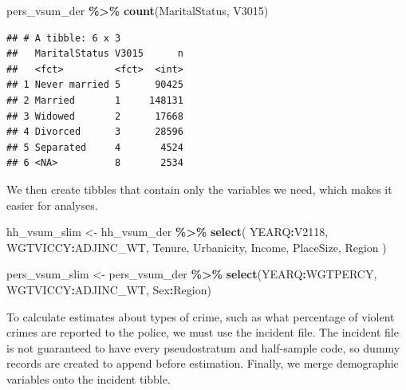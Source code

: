 \documentclass[
]{krantz}
\makeatletter
\newenvironment{Shaded}{\begin{snugshade}}{\end{snugshade}}
\newcommand{\FunctionTok}[1]{\textcolor[rgb]{0.27,0.27,0.27}{\textbf{#1}}}
\newcommand{\NormalTok}[1]{#1}
\newcommand{\OtherTok}[1]{\textcolor[rgb]{0.37,0.37,0.37}{#1}}
\newcommand{\SpecialCharTok}[1]{\textcolor[rgb]{0.43,0.43,0.43}{\textbf{#1}}}
\newenvironment{kframe}{%
\medskip{}
\setlength{\fboxsep}{.8em}
 \def\at@end@of@kframe{}%
 \ifinner\ifhmode%
  \def\at@end@of@kframe{\end{minipage}}%
  \begin{minipage}{\columnwidth}%
 \fi\fi%
 \def\FrameCommand##1{\hskip\@totalleftmargin \hskip-\fboxsep
 \colorbox{shadecolor}{##1}\hskip-\fboxsep
     \hskip-\linewidth \hskip-\@totalleftmargin \hskip\columnwidth}%
 \MakeFramed {\advance\hsize-\width
   \@totalleftmargin\z@ \linewidth\hsize
   \@setminipage}}%
 {\par\unskip\endMakeFramed%
 \at@end@of@kframe}
\renewenvironment{Shaded}{\begin{kframe}}{\end{kframe}}
\makeatother
\begin{document}
\begin{Shaded}
\begin{Highlighting}[]
\NormalTok{pers\_vsum\_der }\SpecialCharTok{\%\textgreater{}\%} \FunctionTok{count}\NormalTok{(MaritalStatus, V3015)}
\end{Highlighting}
\end{Shaded}

\begin{verbatim}
## # A tibble: 6 x 3
##   MaritalStatus V3015      n
##   <fct>         <fct>  <int>
## 1 Never married 5      90425
## 2 Married       1     148131
## 3 Widowed       2      17668
## 4 Divorced      3      28596
## 5 Separated     4       4524
## 6 <NA>          8       2534
\end{verbatim}

We then create tibbles that contain only the variables we need, which makes it easier for analyses.

\begin{Shaded}
\begin{Highlighting}[]
\NormalTok{hh\_vsum\_slim }\OtherTok{\textless{}{-}}\NormalTok{ hh\_vsum\_der }\SpecialCharTok{\%\textgreater{}\%}
  \FunctionTok{select}\NormalTok{(}
\NormalTok{    YEARQ}\SpecialCharTok{:}\NormalTok{V2118,}
\NormalTok{    WGTVICCY}\SpecialCharTok{:}\NormalTok{ADJINC\_WT,}
\NormalTok{    Tenure,}
\NormalTok{    Urbanicity,}
\NormalTok{    Income,}
\NormalTok{    PlaceSize,}
\NormalTok{    Region}
\NormalTok{  )}

\NormalTok{pers\_vsum\_slim }\OtherTok{\textless{}{-}}\NormalTok{ pers\_vsum\_der }\SpecialCharTok{\%\textgreater{}\%}
  \FunctionTok{select}\NormalTok{(YEARQ}\SpecialCharTok{:}\NormalTok{WGTPERCY, WGTVICCY}\SpecialCharTok{:}\NormalTok{ADJINC\_WT, Sex}\SpecialCharTok{:}\NormalTok{Region)}
\end{Highlighting}
\end{Shaded}

To calculate estimates about types of crime, such as what percentage of violent crimes are reported to the police, we must use the incident file. The incident file is not guaranteed to have every pseudostratum and half-sample code, so dummy records are created to append before estimation. Finally, we merge demographic variables onto the incident tibble.
\end{document}
